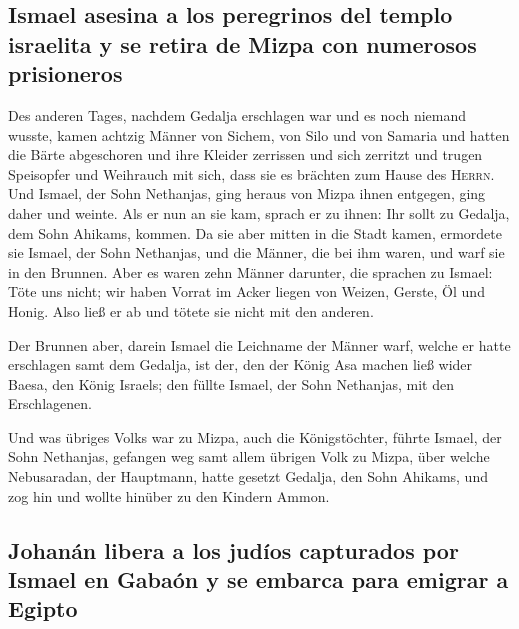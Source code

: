 \hypertarget{ismael-asesina-a-los-peregrinos-del-templo-israelita-y-se-retira-de-mizpa-con-numerosos-prisioneros}{%
\subsection{Ismael asesina a los peregrinos del templo israelita y se
retira de Mizpa con numerosos
prisioneros}\label{ismael-asesina-a-los-peregrinos-del-templo-israelita-y-se-retira-de-mizpa-con-numerosos-prisioneros}}

 Des anderen Tages, nachdem Gedalja erschlagen war und es
noch niemand wusste,  kamen achtzig Männer von Sichem, von
Silo und von Samaria und hatten die Bärte abgeschoren und ihre Kleider
zerrissen und sich zerritzt und trugen Speisopfer und Weihrauch mit
sich, dass sie es brächten zum Hause des \textsc{Herrn}. 
Und Ismael, der Sohn Nethanjas, ging heraus von Mizpa ihnen entgegen,
ging daher und weinte. Als er nun an sie kam, sprach er zu ihnen: Ihr
sollt zu Gedalja, dem Sohn Ahikams, kommen.  Da sie aber
mitten in die Stadt kamen, ermordete sie Ismael, der Sohn Nethanjas, und
die Männer, die bei ihm waren, und warf sie in den Brunnen.
 Aber es waren zehn Männer darunter, die sprachen zu
Ismael: Töte uns nicht; wir haben Vorrat im Acker liegen von Weizen,
Gerste, Öl und Honig. Also ließ er ab und tötete sie nicht mit den
anderen.

 Der Brunnen aber, darein Ismael die Leichname der Männer
warf, welche er hatte erschlagen samt dem Gedalja, ist der, den der
König Asa machen ließ wider Baesa, den König Israels; den füllte Ismael,
der Sohn Nethanjas, mit den Erschlagenen.

 Und was übriges Volks war zu Mizpa, auch die
Königstöchter, führte Ismael, der Sohn Nethanjas, gefangen weg samt
allem übrigen Volk zu Mizpa, über welche Nebusaradan, der Hauptmann,
hatte gesetzt Gedalja, den Sohn Ahikams, und zog hin und wollte hinüber
zu den Kindern Ammon.

\hypertarget{johanuxe1n-libera-a-los-juduxedos-capturados-por-ismael-en-gabauxf3n-y-se-embarca-para-emigrar-a-egipto}{%
\subsection{Johanán libera a los judíos capturados por Ismael en Gabaón
y se embarca para emigrar a
Egipto}\label{johanuxe1n-libera-a-los-juduxedos-capturados-por-ismael-en-gabauxf3n-y-se-embarca-para-emigrar-a-egipto}}

